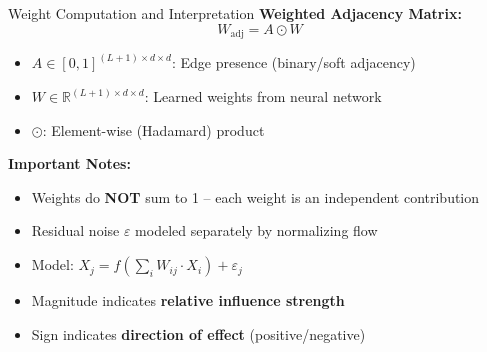 \documentclass[aspectratio=169]{beamer}
\begin{document}
\begin{frame}{Weight Computation and Interpretation}
\textbf{Weighted Adjacency Matrix:}
\begin{equation*}
W_{\text{adj}} = A \odot W
\end{equation*}
\begin{itemize}
    \item $A \in [0,1]^{(L+1) \times d \times d}$: Edge presence (binary/soft adjacency)
    \item $W \in \mathbb{R}^{(L+1) \times d \times d}$: Learned weights from neural network
    \item $\odot$: Element-wise (Hadamard) product
\end{itemize}

\vspace{0.3cm}
\textbf{Important Notes:}
\begin{itemize}
    \item Weights do \textbf{NOT} sum to 1 -- each weight is an independent contribution
    \item Residual noise $\varepsilon$ modeled separately by normalizing flow
    \item Model: $X_j = f\left(\sum_i W_{ij} \cdot X_i\right) + \varepsilon_j$
    \item Magnitude indicates \textbf{relative influence strength}
    \item Sign indicates \textbf{direction of effect} (positive/negative)
\end{itemize}
\end{frame}
\end{document}
